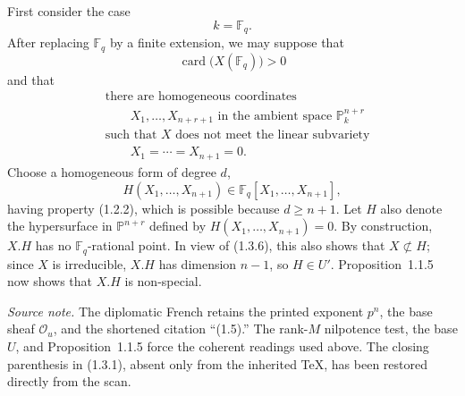 First consider the case
\begin{equation}\tag{1.3.5}
k=\mathbb F_q.
\end{equation}
After replacing $\mathbb F_q$ by a finite extension, we may suppose that
\begin{equation}\tag{1.3.6}
\operatorname{card}\bigl(X(\mathbb F_q)\bigr)>0
\end{equation}
and that
\begin{equation}\tag{1.3.7}
\begin{aligned}
&\text{there are homogeneous coordinates}\\
&\qquad X_1,\dots,X_{n+r+1}\text{ in the ambient space }\mathbb P_k^{n+r}\\
&\text{such that }X\text{ does not meet the linear subvariety}\\
&\qquad X_1=\cdots=X_{n+1}=0.
\end{aligned}
\end{equation}
Choose a homogeneous form of degree $d$,
\begin{equation}\tag{1.3.8}
H(X_1,\dots,X_{n+1})\in
\mathbb F_q[X_1,\dots,X_{n+1}],
\end{equation}
having property (1.2.2), which is possible because $d\geq n+1$.  Let $H$
also denote the hypersurface in $\mathbb P^{n+r}$ defined by
$H(X_1,\dots,X_{n+1})=0$.  By construction, $X.H$ has no
$\mathbb F_q$-rational point.  In view of (1.3.6), this also shows that
$X\not\subset H$; since $X$ is irreducible, $X.H$ has dimension $n-1$, so
$H\in U'$.  Proposition~1.1.5 now shows that $X.H$ is non-special.

\medskip
\noindent\emph{Source note.}
The diplomatic French retains the printed exponent $p^n$, the base sheaf
$\mathcal O_u$, and the shortened citation ``(1.5).''  The rank-$M$
nilpotence test, the base $U$, and Proposition~1.1.5 force the coherent
readings used above.  The closing parenthesis in (1.3.1), absent only from
the inherited TeX, has been restored directly from the scan.
